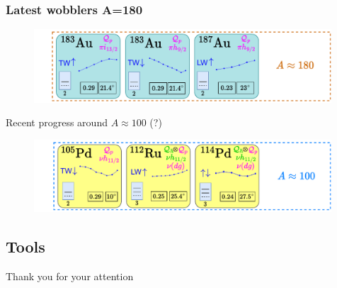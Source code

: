 \documentclass{beamer}
\begin{document}
\begin{frame}
	\frametitle{Latest wobblers A=180}
	\begin{figure}
		\centering
		\includegraphics[width=0.99\textwidth]{figures/wobblers-chart-3.pdf}
	\end{figure}
	Recent progress around $A\approx100$ (?)
	\begin{figure}
		\centering
		\includegraphics[width=0.99\textwidth]{figures/wobblers-chart-1.pdf}
	\end{figure}
\end{frame}

\subsection{Tools}





\begin{frame}[plain] %
	\begin{center}
		\bigskip\bigskip %
		{\Huge Thank you for your attention \faHeart}
	\end{center}
\end{frame}
\end{document}
